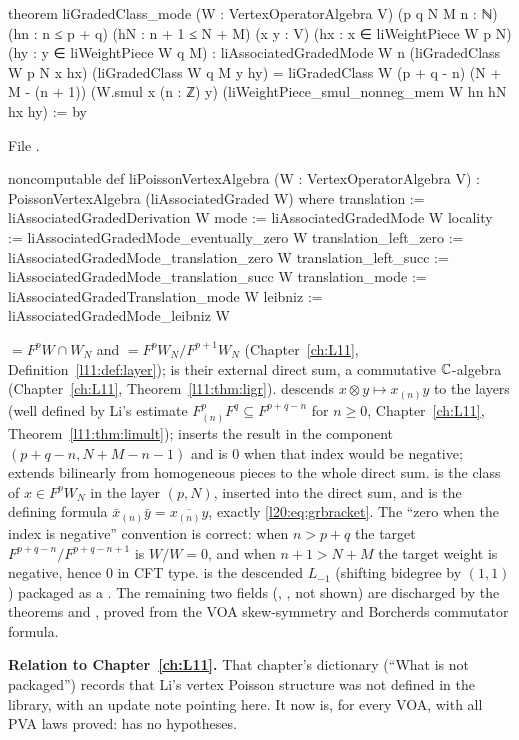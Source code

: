 \begin{leancode}
theorem liGradedClass_mode (W : VertexOperatorAlgebra V) (p q N M n : ℕ)
    (hn : n ≤ p + q) (hN : n + 1 ≤ N + M)
    (x y : V) (hx : x ∈ liWeightPiece W p N) (hy : y ∈ liWeightPiece W q M) :
    liAssociatedGradedMode W n (liGradedClass W p N x hx) (liGradedClass W q M y hy) =
      liGradedClass W (p + q - n) (N + M - (n + 1)) (W.smul x (n : ℤ) y)
        (liWeightPiece_smul_nonneg_mem W hn hN hx hy) := by
\end{leancode}
\noindent File .
\begin{leancode}
noncomputable def liPoissonVertexAlgebra (W : VertexOperatorAlgebra V) :
    PoissonVertexAlgebra (liAssociatedGraded W) where
  translation := liAssociatedGradedDerivation W
  mode := liAssociatedGradedMode W
  locality := liAssociatedGradedMode_eventually_zero W
  translation_left_zero := liAssociatedGradedMode_translation_zero W
  translation_left_succ := liAssociatedGradedMode_translation_succ W
  translation_mode := liAssociatedGradedTranslation_mode W
  leibniz := liAssociatedGradedMode_leibniz W
\end{leancode}

\begin{dictionary}
 $=F^pW\cap W_N$ and  $=F^pW_N/F^{p+1}W_N$
(Chapter~\ref{ch:L11}, Definition~\ref{l11:def:layer});  is their external
direct sum, a commutative ${\mathbb{C}}$-algebra (Chapter~\ref{ch:L11}, Theorem~\ref{l11:thm:ligr}).
 descends $x\otimes y\mapsto x_{(n)}y$ to the layers (well defined by Li's estimate
$F^p_{(n)}F^q\subseteq F^{p+q-n}$ for $n\ge0$, Chapter~\ref{ch:L11}, Theorem~\ref{l11:thm:limult});
 inserts the result in the component $(p+q-n,N+M-n-1)$ and is $0$ when that
index would be negative;  extends bilinearly from homogeneous pieces to the whole
direct sum.  is the class of $x\in F^pW_N$ in the layer $(p,N)$, inserted into
the direct sum, and  is the defining formula
$\bar x_{(n)}\bar y=\overline{x_{(n)}y}$, exactly \eqref{l20:eq:grbracket}. The ``zero when the index is
negative'' convention is correct: when $n>p+q$ the target $F^{p+q-n}/F^{p+q-n+1}$ is $W/W=0$, and when
$n+1>N+M$ the target weight is negative, hence $0$ in CFT type.  is the
descended $L_{-1}$ (shifting bidegree by $(1,1)$) packaged as a . The remaining two fields
(, , not shown) are discharged by the theorems 
and , proved from the VOA skew-symmetry and Borcherds commutator formula.

\textbf{Relation to Chapter~\ref{ch:L11}.} That chapter's dictionary (``What is not packaged'') records that Li's
vertex Poisson structure was not defined in the library, with an update note pointing here. It now is, for every VOA,
with all PVA laws proved:  has no hypotheses.
\end{dictionary}

